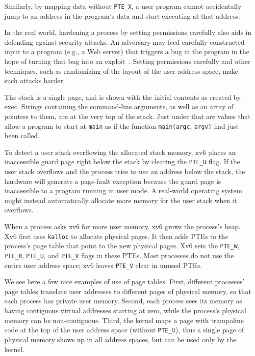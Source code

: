 Similarly, by mapping data without \lstinline{PTE_X}, a user program
cannot accidentally jump to an address in the program's data and start
executing at that address.

In the real world, hardening a process by setting permissions
carefully also aids in defending against security attacks.  An
adversary may feed carefully-constructed input to a program (e.g., a
Web server) that triggers a bug in the program in the hope of turning
that bug into an exploit~\cite{aleph:smashing}.  Setting permissions
carefully and other techniques, such as randomizing of the layout of the
user address space, make such attacks harder.

The stack is a single page, and is shown with the initial contents as
created by exec.  Strings containing the command-line arguments, as
well as an array of pointers to them, are at the very top of the
stack.  Just under that are values that allow a program to start at
\lstinline{main} as if the function \lstinline{main(argc},
\lstinline{argv)} had just been called.

To detect a user stack overflowing the allocated stack memory, xv6
places an inaccessible guard page right below the stack by clearing
the \lstinline{PTE_U} flag. If the user stack overflows and the
process tries to use an address below the stack, the hardware will
generate a page-fault exception because the guard page is inaccessible
to a program running in user mode. A real-world operating system might
instead automatically allocate more memory for the user stack when it
overflows.

When a process asks xv6 for more user memory, xv6 grows the process's
heap. Xv6 first uses {\tt kalloc} to allocate physical pages.
It then adds PTEs to the process's page table that point
to the new physical pages.
Xv6 sets the
\lstinline{PTE_W},
\lstinline{PTE_R},
\lstinline{PTE_U},
and
\lstinline{PTE_V}
flags in these PTEs.
Most processes do not use the entire user address space;
xv6 leaves
\lstinline{PTE_V}
clear in unused PTEs.

We see here a few nice examples of use of page tables.  First,
different processes' page tables translate user addresses to different
pages of physical memory, so that each process has private user
memory.  Second, each process sees its memory as having contiguous
virtual addresses starting at zero, while the process's physical
memory can be non-contiguous.  Third, the kernel maps a page with
trampoline code at the top of the user address space (without
\lstinline{PTE_U}), thus a single page of physical memory shows up in
all address spaces, but can be used only by the kernel.

